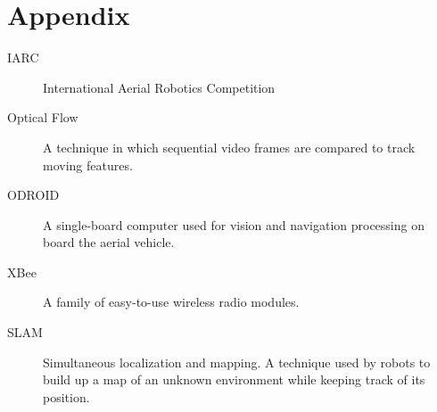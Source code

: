 \documentclass[12pt,letterpaper]{article}
\begin{document}
\section*{Appendix}

\begin{description}
  \item[IARC] International Aerial Robotics Competition
  \item[Optical Flow] A technique in which sequential video frames are compared
    to track moving features.
  \item[ODROID] A single-board computer used for vision and navigation
    processing on board the aerial vehicle.
  \item[XBee] A family of easy-to-use wireless radio modules.
  \item[SLAM] Simultaneous localization and mapping. A technique used by robots
    to build up a map of an unknown environment while keeping track of its
    position.
\end{description}
\end{document}
